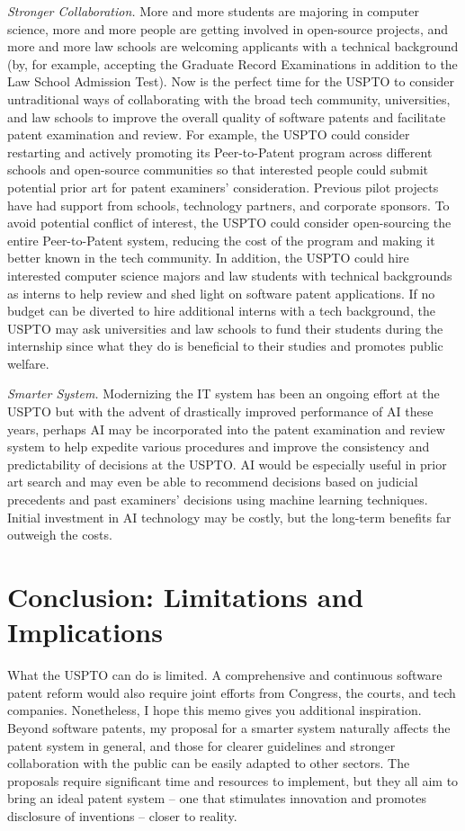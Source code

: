 \documentclass[12pt]{texMemo} %
\begin{document}
\textit{Stronger Collaboration.} \cite{lee} More and more students are majoring in computer science, more and more people are getting involved in open-source projects, and more and more law schools are welcoming applicants with a technical background (by, for example, accepting the Graduate Record Examinations in addition to the Law School Admission Test). Now is the perfect time for the USPTO to consider untraditional ways of collaborating with the broad tech community, universities, and law schools to improve the overall quality of software patents and facilitate patent examination and review. For example, the USPTO could consider restarting and actively promoting its Peer-to-Patent program \cite{kappos} across different schools and open-source communities so that interested people could submit potential prior art for patent examiners’ consideration. Previous pilot projects have had support from schools, technology partners, and corporate sponsors. To avoid potential conflict of interest, the USPTO could consider open-sourcing the entire Peer-to-Patent system, reducing the cost of the program and making it better known in the tech community. In addition, the USPTO could hire interested computer science majors and law students with technical backgrounds as interns to help review and shed light on software patent applications. If no budget can be diverted to hire additional interns with a tech background, the USPTO may ask universities and law schools to fund their students during the internship since what they do is beneficial to their studies and promotes public welfare.

\textit{Smarter System.} Modernizing the IT system has been an ongoing effort at the USPTO \cite{kappos} but with the advent of drastically improved performance of AI these years, perhaps AI may be incorporated into the patent examination and review system to help expedite various procedures and improve the consistency and predictability of decisions at the USPTO. AI would be especially useful in prior art search and may even be able to recommend decisions based on judicial precedents and past examiners’ decisions using machine learning techniques. Initial investment in AI technology may be costly, but the long-term benefits far outweigh the costs.

\section{Conclusion: Limitations and Implications}

What the USPTO can do is limited. A comprehensive and continuous software patent reform would also require joint efforts from Congress, the courts, and tech companies. Nonetheless, I hope this memo gives you additional inspiration. Beyond software patents, my proposal for a smarter system naturally affects the patent system in general, and those for clearer guidelines and stronger collaboration with the public can be easily adapted to other sectors. The proposals require significant time and resources to implement, but they all aim to bring an ideal patent system -- one that stimulates innovation and promotes disclosure of inventions -- closer to reality.

\newpage
\printbibliography
\end{document}
